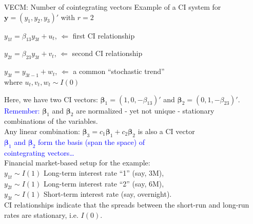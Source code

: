 \documentclass[usenames,dvipsnames]{beamer}
\begin{document}
\begin{frame}{VECM: Number of cointegrating vectors}
\footnotesize
Example of a CI system for $\bm{y} = (y_1, y_2, y_3)'$ with $r=2$
\begin{enumerate}[ {[}1{]} ]
\item $y_{1t} = \beta_{13} y_{3t} + u_t$, \quad  $\Leftarrow$ first CI relationship
\item $y_{2t} = \beta_{23} y_{3t} + v_t$, \quad  $\Leftarrow$ second CI relationship
\item $y_{3t} = y_{3t-1} + w_t$, \hspace*{2.87mm} $\Leftarrow$ a common ``stochastic trend''\\
where $u_t, v_t, w_t \sim I(0)$
\end{enumerate}
Here, we have two CI vectors: $\bm{\beta}_1 = (1,0,-\beta_{13})'$ and $\bm{\beta}_2 = (0,1, -\beta_{23})'$. \\
\medskip
\textcolor{Blue}{Remember:} \quad $\bm{\beta}_1$ and $\bm{\beta}_2$ are normalized - yet not unique - stationary \\ \hspace*{2cm} combinations of the variables. \\
\smallskip
\hspace*{2cm} Any linear combination: $\bm{\beta}_3 = c_1 \bm{\beta}_1 + c_2 \bm{\beta}_2$ is also a CI vector \\
\smallskip
\hspace*{2cm} \textcolor{Blue}{ $\bm{\beta}_1$ and $\bm{\beta}_2$ form the basis (span the space) of \\ \hspace*{2cm} cointegrating vectors\dots}\\
\medskip
Financial market-based setup for the example:\\
$y_{1t} \sim I(1)$ Long-term interest rate ``1''   (say, 3M), \\ 
$y_{2t} \sim I(1)$ Long-term interest rate ``2''   (say, 6M), \\
$y_{3t} \sim I(1)$ Short-term interest rate (say, overnight).\\
\medskip
CI relationships indicate that the spreads between the short-run and long-run rates are stationary, i.e. $I(0)$.
\end{frame}
\end{document}
